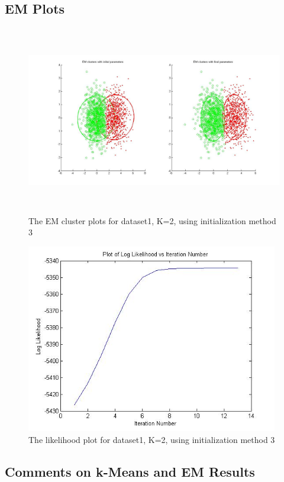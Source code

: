 \documentclass[11pt,psfig]{article}
\begin{document}
\subsection{EM Plots}

\begin{figure}[H]
\centering
\includegraphics[height=3.25in]{dataset1_EMclusterPlots.jpg}
\caption{The EM cluster plots for dataset1, K=2, using initialization method 3}
\end{figure}

\begin{figure}[H]
\centering
\includegraphics[height=3.25in]{dataset1_EMlogLikelihoodPlot.jpg}
\caption{The likelihood plot for dataset1, K=2, using initialization method 3}
\end{figure}

\subsection{Comments on k-Means and EM Results}
\end{document}
